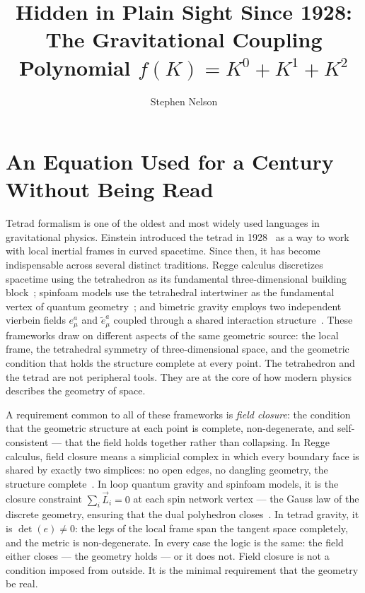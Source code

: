 \documentclass[a4paper,11pt]{article}
\title{\boldmath Hidden in Plain Sight Since 1928:\\
The Gravitational Coupling Polynomial
$f(K) = K^0 + K^1 + K^2$}
\author{Stephen Nelson}
\affiliation{Field Dynamics Research\\
\href{mailto:contact@fielddynamics.org}{contact@fielddynamics.org}}
\begin{document}
\maketitle

\section{An Equation Used for a Century Without Being Read}

Tetrad formalism is one of the oldest and most widely used
languages in gravitational physics. Einstein introduced
the tetrad in 1928~\cite{Einstein1928} as a way to work
with local inertial frames in curved spacetime. Since then,
it has become indispensable across several distinct
traditions. Regge calculus discretizes spacetime using the
tetrahedron as its fundamental three-dimensional building
block~\cite{Regge1961}; spinfoam models use the tetrahedral
intertwiner as the fundamental vertex of quantum
geometry~\cite{Rovelli}; and bimetric gravity employs two
independent vierbein fields $e^a_\mu$ and $\tilde{e}^a_\mu$
coupled through a shared interaction
structure~\cite{HR2012a,Alexandrov2013}. These frameworks
draw on different aspects of the same geometric source: the
local frame, the tetrahedral symmetry of three-dimensional
space, and the geometric condition that holds the structure
complete at every point. The tetrahedron and the tetrad are not peripheral
tools. They are at the core of how modern physics describes
the geometry of space.

A requirement common to all of these frameworks is
\emph{field closure}: the condition that the geometric
structure at each point is complete, non-degenerate, and
self-consistent --- that the field holds together rather
than collapsing. In Regge calculus, field closure means a
simplicial complex in which every boundary face is shared
by exactly two simplices: no open edges, no dangling
geometry, the structure complete~\cite{Regge1961}. In loop
quantum gravity and spinfoam models, it is the closure
constraint $\sum_i \vec{L}_i = 0$ at each spin network
vertex --- the Gauss law of the discrete geometry, ensuring
that the dual polyhedron closes~\cite{Rovelli}. In tetrad
gravity, it is $\det(e) \neq 0$: the legs of the local
frame span the tangent space completely, and the metric is
non-degenerate. In every case the logic is the same: the
field either closes --- the geometry holds --- or it does
not. Field closure is not a condition imposed from outside.
It is the minimal requirement that the geometry be real.
\end{document}
